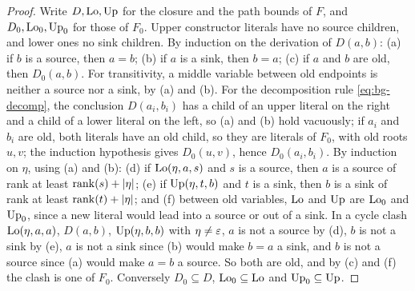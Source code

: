 \begin{proof}
Write $D,\mathrm{Lo},\mathrm{Up}$ for the closure and the path bounds of $F$, and
$D_0,\mathrm{Lo}_0,\mathrm{Up}_0$ for those of $F_0$. Upper constructor literals have no source
children, and lower ones no sink children. By induction on the derivation of
$D(a,b)$: (a) if $b$ is a source, then $a=b$; (b) if $a$ is a sink, then $b=a$;
(c) if $a$ and $b$ are old, then $D_0(a,b)$. For transitivity, a middle
variable between old endpoints is neither a source nor a sink, by (a) and (b).
For the decomposition rule \cref{eq:bg-decomp}, the conclusion
$D(a_i,b_i)$ has a child of an upper literal on the right and a child of a
lower literal on the left, so (a) and (b) hold vacuously; if $a_i$ and $b_i$
are old, both literals have an old child, so they are literals of $F_0$, with
old roots $u,v$; the induction hypothesis gives $D_0(u,v)$, hence
$D_0(a_i,b_i)$. By induction on $\eta$, using (a) and (b): (d) if $\mathrm{Lo}(\eta,a,s)$
and $s$ is a source, then $a$ is a source of rank at least
$\operatorname{rank}(s)+\lvert \eta\rvert$; (e) if $\mathrm{Up}(\eta,t,b)$ and $t$ is a sink,
then $b$ is a sink of rank at least $\operatorname{rank}(t)+\lvert \eta\rvert$; and (f)
between old variables, $\mathrm{Lo}$ and $\mathrm{Up}$ are $\mathrm{Lo}_0$ and $\mathrm{Up}_0$, since a new
literal would lead into a source or out of a sink. In a cycle clash
$\mathrm{Lo}(\eta,a,a)$, $D(a,b)$, $\mathrm{Up}(\eta,b,b)$ with $\eta\ne\varepsilon$, $a$ is not a
source by (d), $b$ is not a sink by (e), $a$ is not a sink since (b) would make
$b=a$ a sink, and $b$ is not a source since (a) would make $a=b$ a source. So
both are old, and by (c) and (f) the clash is one of $F_0$. Conversely
$D_0\subseteq D$, $\mathrm{Lo}_0\subseteq\mathrm{Lo}$ and $\mathrm{Up}_0\subseteq\mathrm{Up}$.
\end{proof}

